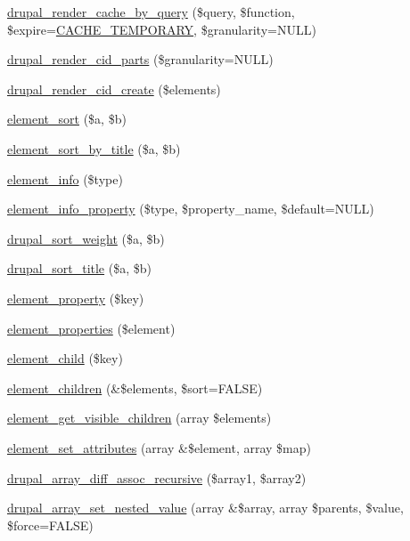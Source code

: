 \begin{DoxyCompactItemize}
\item 
\hyperlink{common_8inc_a7ad6a849e842a3c78e25cdd127e5ed0f}{drupal\_\-render\_\-cache\_\-by\_\-query} (\$query, \$function, \$expire=\hyperlink{bootstrap_8inc_a1f2558e91eb9f33d14168bb8dfd99690}{CACHE\_\-TEMPORARY}, \$granularity=NULL)
\item 
\hyperlink{common_8inc_ae2cdc2f17d6e9fe1bbc162b40e94bd5d}{drupal\_\-render\_\-cid\_\-parts} (\$granularity=NULL)
\item 
\hyperlink{common_8inc_a28d419376079fb2c1f790d4af72451ec}{drupal\_\-render\_\-cid\_\-create} (\$elements)
\item 
\hyperlink{common_8inc_a61f0cc62072ab44aa349478fb7219c74}{element\_\-sort} (\$a, \$b)
\item 
\hyperlink{common_8inc_af8b5e243059cba2c266cad6c94712190}{element\_\-sort\_\-by\_\-title} (\$a, \$b)
\item 
\hyperlink{common_8inc_a5745b4e27c2946a902d49c0923f46739}{element\_\-info} (\$type)
\item 
\hyperlink{common_8inc_a0fbfab66764cb42fdd2f76609c91f5e7}{element\_\-info\_\-property} (\$type, \$property\_\-name, \$default=NULL)
\item 
\hyperlink{common_8inc_ab998a16150fa137f79c86d197e809fb8}{drupal\_\-sort\_\-weight} (\$a, \$b)
\item 
\hyperlink{common_8inc_a3978e07c67adb7db3b9728c54d1ef67b}{drupal\_\-sort\_\-title} (\$a, \$b)
\item 
\hyperlink{common_8inc_a7a93c74e138f24e5f7e672972644f1c3}{element\_\-property} (\$key)
\item 
\hyperlink{common_8inc_a4ae6d339b27757556fe914f9d78d91e5}{element\_\-properties} (\$element)
\item 
\hyperlink{common_8inc_a3063341f48382cc5ecce25eb1eaa7a0d}{element\_\-child} (\$key)
\item 
\hyperlink{common_8inc_ad38ed83e102f4f8c6c47e416543969bc}{element\_\-children} (\&\$elements, \$sort=FALSE)
\item 
\hyperlink{common_8inc_a16b95f134528bd21d59f2a9ece2b7d2f}{element\_\-get\_\-visible\_\-children} (array \$elements)
\item 
\hyperlink{common_8inc_a117d5915f8fe2b93e65d662bcf69cba5}{element\_\-set\_\-attributes} (array \&\$element, array \$map)
\item 
\hyperlink{common_8inc_a9690f6b923ab69ff15d0f7dbf7bc1193}{drupal\_\-array\_\-diff\_\-assoc\_\-recursive} (\$array1, \$array2)
\item 
\hyperlink{common_8inc_a8a4f31053469df300ce2812a57992c5b}{drupal\_\-array\_\-set\_\-nested\_\-value} (array \&\$array, array \$parents, \$value, \$force=FALSE)

\end{DoxyCompactItemize}
